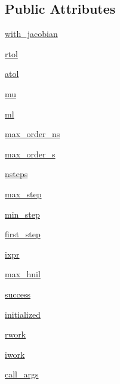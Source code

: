 \subsection*{Public Attributes}
\begin{DoxyCompactItemize}
\item 
\hyperlink{classscipy_1_1integrate_1_1__ode_1_1lsoda_a0599d99adba36f2a0a621bf486621aff}{with\+\_\+jacobian}
\item 
\hyperlink{classscipy_1_1integrate_1_1__ode_1_1lsoda_a5dcfe41ae577fa202fbdb1a0e0477e0e}{rtol}
\item 
\hyperlink{classscipy_1_1integrate_1_1__ode_1_1lsoda_a8e02c8dd564d09bf8e7c5f34bc6fa4f2}{atol}
\item 
\hyperlink{classscipy_1_1integrate_1_1__ode_1_1lsoda_a13f0477973b5308cd6262a75d2ca9134}{mu}
\item 
\hyperlink{classscipy_1_1integrate_1_1__ode_1_1lsoda_acbfa129d09bdad9f2223f71d5f8d6ecd}{ml}
\item 
\hyperlink{classscipy_1_1integrate_1_1__ode_1_1lsoda_a500ca62b89cde89304cbb745acc802f3}{max\+\_\+order\+\_\+ns}
\item 
\hyperlink{classscipy_1_1integrate_1_1__ode_1_1lsoda_a23b83dd8fc3b1582ba517c94e0658ffc}{max\+\_\+order\+\_\+s}
\item 
\hyperlink{classscipy_1_1integrate_1_1__ode_1_1lsoda_ae2921fe17f082a39b3d01fa0fa07b7b5}{nsteps}
\item 
\hyperlink{classscipy_1_1integrate_1_1__ode_1_1lsoda_a0e012b5f9897ec558854b9ada86ab112}{max\+\_\+step}
\item 
\hyperlink{classscipy_1_1integrate_1_1__ode_1_1lsoda_ab20e2737c02e1dfb443a86c0eeba58d3}{min\+\_\+step}
\item 
\hyperlink{classscipy_1_1integrate_1_1__ode_1_1lsoda_abc34dce6adf82d6fe5f2d38c41db8140}{first\+\_\+step}
\item 
\hyperlink{classscipy_1_1integrate_1_1__ode_1_1lsoda_a7746b3ff82685304941cb109c5d5a053}{ixpr}
\item 
\hyperlink{classscipy_1_1integrate_1_1__ode_1_1lsoda_ae10dca28c38252f7126955e4f7a12d8c}{max\+\_\+hnil}
\item 
\hyperlink{classscipy_1_1integrate_1_1__ode_1_1lsoda_a55a24b76a5a12e150fd66df76374c9bd}{success}
\item 
\hyperlink{classscipy_1_1integrate_1_1__ode_1_1lsoda_aed90621f6a54e0c1e68e6ce58cd9a0b9}{initialized}
\item 
\hyperlink{classscipy_1_1integrate_1_1__ode_1_1lsoda_ae67f146a20831b75b2365063da3a14b1}{rwork}
\item 
\hyperlink{classscipy_1_1integrate_1_1__ode_1_1lsoda_a86fdf074b24df65276471b2f0902eedd}{iwork}
\item 
\hyperlink{classscipy_1_1integrate_1_1__ode_1_1lsoda_af63bed470ba1d62289b215320cea7b3c}{call\+\_\+args}
\end{DoxyCompactItemize}
